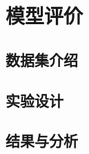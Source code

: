 \chapter[\hspace{0pt}模型评价]{{\heiti{}\hspace{0pt}模型评价}}\label{chapter4: 模型评价}
\removelofgap
\removelotgap

\section[\hspace{-2pt}数据集介绍]{{\heiti{} \hspace{-8pt}数据集介绍}}\label{section4: 数据集介绍}

\section[\hspace{-2pt}实验设计]{{\heiti{} \hspace{-8pt}实验设计}}\label{section4: 实验设计}

\section[\hspace{-2pt}结果与分析]{{\heiti{} \hspace{-8pt}结果与分析}}\label{section4: 结果与分析}
